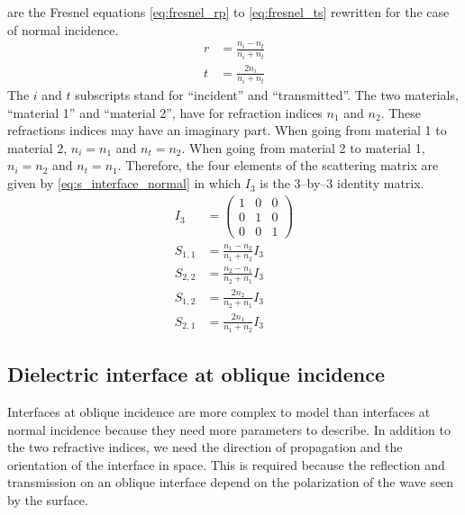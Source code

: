  are the Fresnel equations \eqref{eq:fresnel_rp} to \eqref{eq:fresnel_ts} rewritten for the case of normal incidence.
\begin{subequations}
    \begin{align}
        r &= \frac{n_i - n_t}{n_i + n_t} \label{eq:fresnel_normal_r}\\
        t &= \frac{2 n_i}{n_i + n_t} \label{eq:fresnel_normal_t}
    \end{align}
    \label{eq:fresnel_normal}
\end{subequations}
The $i$ and $t$ subscripts stand for ``incident'' and ``transmitted''.
The two materials, ``material 1'' and ``material 2'', have for refraction indices $n_1$ and $n_2$.
These refractions indices may have an imaginary part.
When going from material 1 to material 2, $n_i = n_1$ and $n_t = n_2$.
When going from material 2 to material 1, $n_i = n_2$ and $n_t = n_1$.
Therefore, the four elements of the scattering matrix are given by \cref{eq:s_interface_normal} in which $I_3$ is the 3--by--3 identity matrix.
\begin{subequations}
    \begin{align}
        I_3 &= \begin{pmatrix} 1&0&0\\0&1&0\\0&0&1 \end{pmatrix}
        \\
        S_{1, 1} &= \frac{n_1 - n_2}{n_1 + n_2} I_3
        \\
        S_{2, 2} &= \frac{n_2 - n_1}{n_2 + n_1} I_3
        \\
        S_{1, 2} &= \frac{2 n_2}{n_2 + n_1} I_3
        \\
        S_{2, 1} &= \frac{2 n_1}{n_1 + n_2} I_3
    \end{align}
    \label{eq:s_interface_normal}
\end{subequations}





\clearpage
\subsection{Dielectric interface at oblique incidence}
\label{sec:interface_at_oblique_incidence}
Interfaces at oblique incidence are more complex to model than interfaces at normal incidence because they need more parameters to describe.
In addition to the two refractive indices, we need the direction of propagation and the orientation of the interface in space.
This is required because the reflection and transmission on an oblique interface depend on the polarization of the wave seen by the surface.

